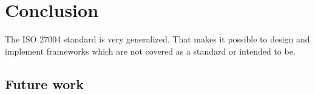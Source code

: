\section{Conclusion}
\label{sec:conclusion}

The ISO 27004 standard is very generalized. That makes it possible to design and implement frameworks which are not covered as a standard or intended to be.

\subsection{Future work}
